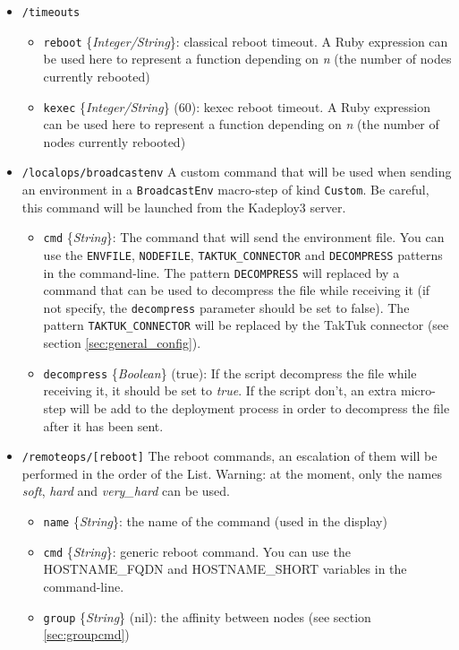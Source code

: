 \documentclass[a4wide,10pt,oneside]{book}
\newcommand{\ypath}[1]{\texttt{#1}}
\newcommand{\yfield}[2]{\texttt{#1} {\small\{{\emph{#2}}\}}:}
\newcommand{\yfieldd}[3]{\texttt{#1} {\small\{{\emph{#2}}\}} {\small(}#3{\small)}:}
\begin{document}
\begin{itemize}
  \item \ypath{/timeouts}
  \begin{itemize}
    \item \yfield{reboot}{Integer/String} classical reboot timeout. A Ruby expression can be used here to represent a function depending on \emph{n} (the number of nodes currently rebooted)
    \item \yfieldd{kexec}{Integer/String}{60} kexec reboot timeout. A Ruby expression can be used here to represent a function depending on \emph{n} (the number of nodes currently rebooted)
  \end{itemize}
  \item \ypath{/localops/broadcastenv} A custom command that will be used when sending an environment in a \texttt{BroadcastEnv} macro-step of kind \texttt{Custom}. Be careful, this command will be launched from the Kadeploy3 server.
  \begin{itemize}
    \item \yfield{cmd}{String} The command that will send the environment file. You can use the \texttt{ENVFILE}, \texttt{NODEFILE}, \texttt{TAKTUK\_CONNECTOR} and \texttt{DECOMPRESS} patterns in the command-line. The pattern \texttt{DECOMPRESS} will replaced by a command that can be used to decompress the file while receiving it (if not specify, the \texttt{decompress} parameter should be set to false). The pattern \texttt{TAKTUK\_CONNECTOR} will be replaced by the TakTuk connector (see section \ref{sec:general_config}).
    \item \yfieldd{decompress}{Boolean}{true} If the script decompress the file while receiving it, it should be set to \emph{true}. If the script don't, an extra micro-step will be add to the deployment process in order to decompress the file after it has been sent.
  \end{itemize}
  \item \ypath{/remoteops/[reboot]} The reboot commands, an escalation of them will be performed in the order of the List. Warning: at the moment, only the names \emph{soft}, \emph{hard} and \emph{very\_hard} can be used.
  \begin{itemize}
    \item \yfield{name}{String} the name of the command (used in the display)
    \item \yfield{cmd}{String} generic reboot command. You can use the HOSTNAME\_FQDN and HOSTNAME\_SHORT variables in the command-line.
    \item \yfieldd{group}{String}{nil} the affinity between nodes (see section \ref{sec:groupcmd})
  \end{itemize}


\end{itemize}
\end{document}

